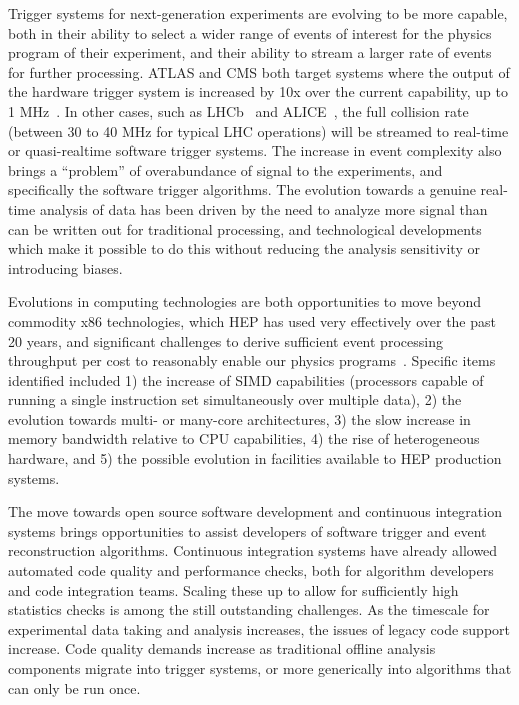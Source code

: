 Trigger systems for next-generation experiments are evolving to be more capable, both in their ability to select a wider range of events of interest for the physics program of their experiment, and their ability to stream a larger rate of events for further processing.  ATLAS and CMS both target systems where the output of the hardware trigger system is increased by 10x over the current capability, up to 1 MHz~\cite{ATLAS2015,CMS2015}. In other cases, such as LHCb~\cite{LHCb2014} and ALICE~\cite{ALICE2015}, the full collision rate (between 30 to 40 MHz for typical LHC operations) will be streamed to real-time or quasi-realtime software trigger systems. The increase in event complexity also brings a “problem” of overabundance of signal to the experiments, and specifically the software trigger algorithms. The evolution towards a genuine real-time analysis of data has been driven by the need to analyze more signal than can be written out for traditional processing, and technological developments which make it possible to do this without reducing the analysis sensitivity or introducing biases.

Evolutions in computing technologies are both opportunities to move beyond commodity x86 technologies, which HEP has used very effectively over the past 20 years, and significant challenges to derive sufficient event processing throughput per cost to reasonably enable our physics programs~\cite{Bird2014}.  Specific items identified included 1) the increase of SIMD capabilities (processors capable of running a single instruction set simultaneously over multiple data), 2) the evolution towards multi- or many-core architectures, 3) the slow increase in memory bandwidth relative to CPU capabilities, 4) the rise of heterogeneous hardware, and 5) the possible evolution in facilities available to HEP production systems. 

The move towards open source software development and continuous integration systems brings opportunities to assist developers of software trigger and event reconstruction algorithms. Continuous integration systems have already allowed automated code quality and performance checks, both for algorithm developers and code integration teams. Scaling these up to allow for sufficiently high statistics checks is among the still outstanding challenges. As the timescale for experimental data taking and analysis increases, the issues of legacy code support increase. Code quality demands increase as traditional offline analysis components migrate into trigger systems, or more generically into algorithms that can only be run once. 

